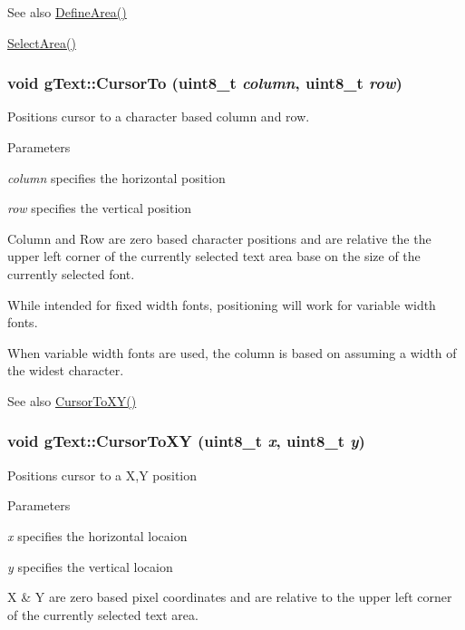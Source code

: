 \begin{DoxySeeAlso}{See also}
\hyperlink{classg_text_a8bc94b15c7864ef34491e8ef5681bfd4}{DefineArea()} 

\hyperlink{classg_text_a3d2fcd1f48b1e44611b7cf6fb2bae5db}{SelectArea()} 
\end{DoxySeeAlso}
\hypertarget{classg_text_a7ce5b6e29b0d26d85064e6235927af75}{
\subsubsection[{CursorTo}]{\setlength{\rightskip}{0pt plus 5cm}void gText::CursorTo (uint8\_\-t {\em column}, \/  uint8\_\-t {\em row})}}
\label{classg_text_a7ce5b6e29b0d26d85064e6235927af75}
Positions cursor to a character based column and row.


\begin{DoxyParams}{Parameters}
\item[{\em column}]specifies the horizontal position \item[{\em row}]specifies the vertical position\end{DoxyParams}
Column and Row are zero based character positions and are relative the the upper left corner of the currently selected text area base on the size of the currently selected font.

While intended for fixed width fonts, positioning will work for variable width fonts.

When variable width fonts are used, the column is based on assuming a width of the widest character.

\begin{DoxySeeAlso}{See also}
\hyperlink{classg_text_a299ea80c33b47ffc1043e472d48d670d}{CursorToXY()} 
\end{DoxySeeAlso}
\hypertarget{classg_text_a299ea80c33b47ffc1043e472d48d670d}{
\subsubsection[{CursorToXY}]{\setlength{\rightskip}{0pt plus 5cm}void gText::CursorToXY (uint8\_\-t {\em x}, \/  uint8\_\-t {\em y})}}
\label{classg_text_a299ea80c33b47ffc1043e472d48d670d}
Positions cursor to a X,Y position


\begin{DoxyParams}{Parameters}
\item[{\em x}]specifies the horizontal locaion \item[{\em y}]specifies the vertical locaion\end{DoxyParams}
X \& Y are zero based pixel coordinates and are relative to the upper left corner of the currently selected text area.

